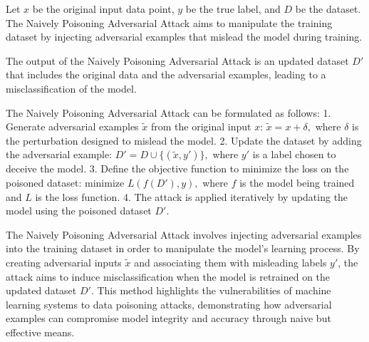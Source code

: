 Let \( x \) be the original input data point, \( y \) be the true label, and \( D \) be the dataset. The Naively Poisoning Adversarial Attack aims to manipulate the training dataset by injecting adversarial examples that mislead the model during training.

The output of the Naively Poisoning Adversarial Attack is an updated dataset \( D' \) that includes the original data and the adversarial examples, leading to a misclassification of the model.

The Naively Poisoning Adversarial Attack can be formulated as follows:
1. Generate adversarial examples \( \tilde{x} \) from the original input \( x \):
   $
   \tilde{x} = x + \delta,
   $
   where \( \delta \) is the perturbation designed to mislead the model.
2. Update the dataset by adding the adversarial example:
   $
   D' = D \cup \{(\tilde{x}, y')\},
   $
   where \( y' \) is a label chosen to deceive the model.
3. Define the objective function to minimize the loss on the poisoned dataset:
   $
   \text{minimize } L(f(D'), y),
   $
   where \( f \) is the model being trained and \( L \) is the loss function.
4. The attack is applied iteratively by updating the model using the poisoned dataset \( D' \).

The Naively Poisoning Adversarial Attack involves injecting adversarial examples into the training dataset in order to manipulate the model's learning process. By creating adversarial inputs \( \tilde{x} \) and associating them with misleading labels \( y' \), the attack aims to induce misclassification when the model is retrained on the updated dataset \( D' \). This method highlights the vulnerabilities of machine learning systems to data poisoning attacks, demonstrating how adversarial examples can compromise model integrity and accuracy through naive but effective means.
